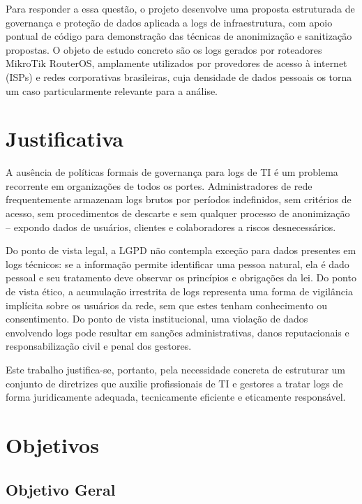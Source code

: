 Para responder a essa questão, o projeto desenvolve uma proposta estruturada de governança e proteção de dados aplicada a logs de infraestrutura, com apoio pontual de código para demonstração das técnicas de anonimização e sanitização propostas. O objeto de estudo concreto são os logs gerados por roteadores MikroTik RouterOS, amplamente utilizados por provedores de acesso à internet (ISPs) e redes corporativas brasileiras, cuja densidade de dados pessoais os torna um caso particularmente relevante para a análise.

\section{Justificativa}
\label{sec:justificativa}

A ausência de políticas formais de governança para logs de TI é um problema recorrente em organizações de todos os portes. Administradores de rede frequentemente armazenam logs brutos por períodos indefinidos, sem critérios de acesso, sem procedimentos de descarte e sem qualquer processo de anonimização -- expondo dados de usuários, clientes e colaboradores a riscos desnecessários.

Do ponto de vista legal, a LGPD não contempla exceção para dados presentes em logs técnicos: se a informação permite identificar uma pessoa natural, ela é dado pessoal e seu tratamento deve observar os princípios e obrigações da lei. Do ponto de vista ético, a acumulação irrestrita de logs representa uma forma de vigilância implícita sobre os usuários da rede, sem que estes tenham conhecimento ou consentimento. Do ponto de vista institucional, uma violação de dados envolvendo logs pode resultar em sanções administrativas, danos reputacionais e responsabilização civil e penal dos gestores.

Este trabalho justifica-se, portanto, pela necessidade concreta de estruturar um conjunto de diretrizes que auxilie profissionais de TI e gestores a tratar logs de forma juridicamente adequada, tecnicamente eficiente e eticamente responsável.

\section{Objetivos}
\label{sec:objetivos}

\subsection{Objetivo Geral}
\label{subsec:objetivo-geral}

